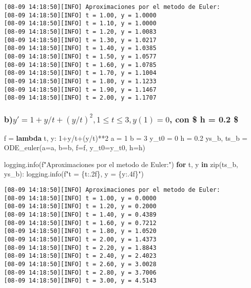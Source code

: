 \documentclass[
  letterpaper,
  DIV=11,
  numbers=noendperiod]{scrartcl}
\newenvironment{Shaded}{\begin{snugshade}}{\end{snugshade}}
\newcommand{\BuiltInTok}[1]{\textcolor[rgb]{0.00,0.23,0.31}{#1}}
\newcommand{\ControlFlowTok}[1]{\textcolor[rgb]{0.00,0.23,0.31}{\textbf{#1}}}
\newcommand{\DecValTok}[1]{\textcolor[rgb]{0.68,0.00,0.00}{#1}}
\newcommand{\FloatTok}[1]{\textcolor[rgb]{0.68,0.00,0.00}{#1}}
\newcommand{\KeywordTok}[1]{\textcolor[rgb]{0.00,0.23,0.31}{\textbf{#1}}}
\newcommand{\NormalTok}[1]{\textcolor[rgb]{0.00,0.23,0.31}{#1}}
\newcommand{\OperatorTok}[1]{\textcolor[rgb]{0.37,0.37,0.37}{#1}}
\newcommand{\SpecialCharTok}[1]{\textcolor[rgb]{0.37,0.37,0.37}{#1}}
\newcommand{\SpecialStringTok}[1]{\textcolor[rgb]{0.13,0.47,0.30}{#1}}
\begin{document}
\begin{verbatim}
[08-09 14:18:50][INFO] Aproximaciones por el metodo de Euler:
[08-09 14:18:50][INFO] t = 1.00, y = 1.0000
[08-09 14:18:50][INFO] t = 1.10, y = 1.0000
[08-09 14:18:50][INFO] t = 1.20, y = 1.0083
[08-09 14:18:50][INFO] t = 1.30, y = 1.0217
[08-09 14:18:50][INFO] t = 1.40, y = 1.0385
[08-09 14:18:50][INFO] t = 1.50, y = 1.0577
[08-09 14:18:50][INFO] t = 1.60, y = 1.0785
[08-09 14:18:50][INFO] t = 1.70, y = 1.1004
[08-09 14:18:50][INFO] t = 1.80, y = 1.1233
[08-09 14:18:50][INFO] t = 1.90, y = 1.1467
[08-09 14:18:50][INFO] t = 2.00, y = 1.1707
\end{verbatim}

\subsubsection{\texorpdfstring{b)\(y' = 1+y/t+(y/t)^2, 1 \leq t \leq 3 ,  y(1) = 0\),
con \$ h = 0.2
\$}{b)y\textquotesingle{} = 1+y/t+(y/t)\^{}2, 1 \textbackslash leq t \textbackslash leq 3 ,  y(1) = 0, con \$ h = 0.2 \$}}\label{by-1ytyt2-1-leq-t-leq-3-y1-0-con-h-0.2}

\begin{Shaded}
\begin{Highlighting}[]
\NormalTok{f }\OperatorTok{=} \KeywordTok{lambda}\NormalTok{ t, y: }\DecValTok{1}\OperatorTok{+}\NormalTok{y}\OperatorTok{/}\NormalTok{t}\OperatorTok{+}\NormalTok{(y}\OperatorTok{/}\NormalTok{t)}\OperatorTok{**}\DecValTok{2}
\NormalTok{a }\OperatorTok{=} \DecValTok{1} 
\NormalTok{b }\OperatorTok{=} \DecValTok{3} 
\NormalTok{y\_t0 }\OperatorTok{=} \DecValTok{0} 
\NormalTok{h }\OperatorTok{=} \FloatTok{0.2} 
\NormalTok{ys\_b, ts\_b }\OperatorTok{=}\NormalTok{ ODE\_euler(a}\OperatorTok{=}\NormalTok{a, b}\OperatorTok{=}\NormalTok{b, f}\OperatorTok{=}\NormalTok{f, y\_t0}\OperatorTok{=}\NormalTok{y\_t0, h}\OperatorTok{=}\NormalTok{h)}

\NormalTok{logging.info(}\SpecialStringTok{f"Aproximaciones por el metodo de Euler:"}\NormalTok{)}
\ControlFlowTok{for}\NormalTok{ t, y }\KeywordTok{in} \BuiltInTok{zip}\NormalTok{(ts\_b, ys\_b):}
\NormalTok{    logging.info(}\SpecialStringTok{f"t = }\SpecialCharTok{\{}\NormalTok{t}\SpecialCharTok{:.2f\}}\SpecialStringTok{, y = }\SpecialCharTok{\{}\NormalTok{y}\SpecialCharTok{:.4f\}}\SpecialStringTok{"}\NormalTok{)}
\end{Highlighting}
\end{Shaded}

\begin{verbatim}
[08-09 14:18:50][INFO] Aproximaciones por el metodo de Euler:
[08-09 14:18:50][INFO] t = 1.00, y = 0.0000
[08-09 14:18:50][INFO] t = 1.20, y = 0.2000
[08-09 14:18:50][INFO] t = 1.40, y = 0.4389
[08-09 14:18:50][INFO] t = 1.60, y = 0.7212
[08-09 14:18:50][INFO] t = 1.80, y = 1.0520
[08-09 14:18:50][INFO] t = 2.00, y = 1.4373
[08-09 14:18:50][INFO] t = 2.20, y = 1.8843
[08-09 14:18:50][INFO] t = 2.40, y = 2.4023
[08-09 14:18:50][INFO] t = 2.60, y = 3.0028
[08-09 14:18:50][INFO] t = 2.80, y = 3.7006
[08-09 14:18:50][INFO] t = 3.00, y = 4.5143
\end{verbatim}
\end{document}
